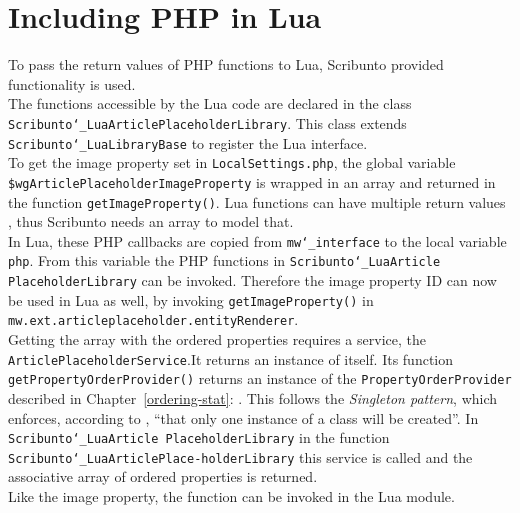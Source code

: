 \section{Including PHP in Lua}\label{including-lua}

To pass the return values of PHP functions to Lua, Scribunto provided functionality is used. \\
The functions accessible by the Lua code are declared in the class \texttt{\justify Scribunto\char`_LuaArticlePlaceholderLibrary}. This class extends \texttt{\justify Scribunto\char`_LuaLibraryBase} to register the Lua interface. \\
To get the image property set in \texttt{\justify LocalSettings.php}, the global variable \texttt{\justify \$wgArticlePlaceholderImageProperty} is wrapped in an array and returned in the function \texttt{\justify getImageProperty()}. Lua functions can have multiple return values \citep{luabook:01}, thus Scribunto needs an array to model that. \\
In Lua, these PHP callbacks are copied from \texttt{\justify mw\char`_interface} to the local variable \texttt{php}. From this variable the PHP functions in \texttt{\justify Scribunto\char`_LuaArticle PlaceholderLibrary} can be invoked. Therefore the image property ID can now be used in Lua as well, by invoking \texttt{\justify getImageProperty()} in \texttt{\justify mw.ext.articleplaceholder.entityRenderer}. \\
Getting the array with the ordered properties requires a service, the \texttt{ArticlePlaceholderService}.It returns an instance of itself. Its function \texttt{\justify getPropertyOrderProvider()} returns an instance of the \texttt{\justify PropertyOrderProvider} described in Chapter~\ref{ordering-stat}: . This follows the \textit{Singleton pattern}, which enforces, according to \citet{designpattern}, ``that only one instance of a class will be created''.
In \texttt{\justify Scribunto\char`_LuaArticle PlaceholderLibrary} in the function \texttt{\justify Scribunto\char`_LuaArticlePlace-holderLibrary} this service is called and the associative array of ordered properties is returned.\\
Like the image property, the function can be invoked in the Lua module.

